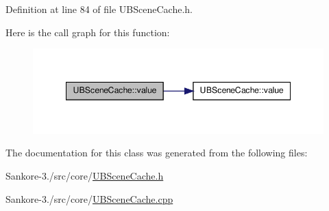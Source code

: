 Definition at line 84 of file U\-B\-Scene\-Cache.\-h.



Here is the call graph for this function\-:
\nopagebreak
\begin{figure}[H]
\begin{center}
\leavevmode
\includegraphics[width=348pt]{d2/d79/class_u_b_scene_cache_a11fe22fa85cc65c6779f3248687613a4_cgraph}
\end{center}
\end{figure}




The documentation for this class was generated from the following files\-:\begin{DoxyCompactItemize}
\item 
Sankore-\/3./src/core/\hyperlink{_u_b_scene_cache_8h}{U\-B\-Scene\-Cache.\-h}\item 
Sankore-\/3./src/core/\hyperlink{_u_b_scene_cache_8cpp}{U\-B\-Scene\-Cache.\-cpp}\end{DoxyCompactItemize}
